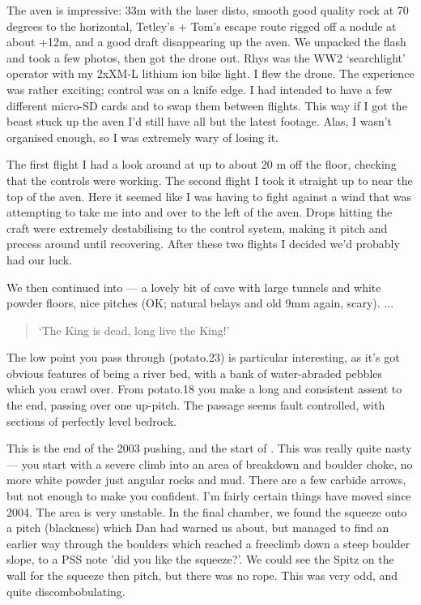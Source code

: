 The aven is impressive: 33m with the laser disto, smooth good quality rock at 70 degrees to the horizontal, Tetley's + Tom's escape route rigged off a nodule at about +12m, and a good draft disappearing up the aven.
We unpacked the flash and took a few photos, then got the drone out. Rhys was the WW2 `searchlight' operator with my 2xXM-L lithium ion bike light. I flew the drone.
The experience was rather exciting; control was on a knife edge. I had intended to have a few different micro-SD cards and to swap them between flights. This way if I got the beast stuck up the aven I'd still have all but the latest footage. Alas, I wasn't organised enough, so I was extremely wary of losing it.

The first flight I had a look around at up to about 20 m off the floor, checking that the controls were working. The second flight I took it straight up to near the top of the aven. Here it seemed like I was having to fight against a wind that was attempting to take me into and over to the left of the aven. Drops hitting the craft were extremely destabilising to the control system, making it pitch and precess around until recovering. After these two flights I decided we'd probably had our luck.

We then continued into  --- a lovely bit of cave with large tunnels and white powder floors, nice pitches (OK; natural belays and old 9mm again, scary). ...

\begin{quote}
`The King is dead, long live the King!'
\end{quote}

The low point you pass through (potato.23) is particular interesting, as it's got obvious features of being a river bed, with a bank of water-abraded pebbles which you crawl over.
From potato.18 you make a long and consistent assent to the end, passing over one up-pitch. The passage seems fault controlled, with sections of perfectly level bedrock.

This is the end of the 2003 pushing, and the start of . This was really quite nasty --- you start with a severe climb into an area of breakdown and boulder choke, no more white powder just angular rocks and mud. There are a few carbide arrows, but not enough to make you confident. I'm fairly certain things have moved since 2004. The area is very unstable. In the final chamber, we found the squeeze onto a pitch (blackness) which Dan had warned us about, but managed to find an earlier way through the boulders which reached a freeclimb down a steep boulder slope, to a PSS note 'did you like the squeeze?'. We could see the Spitz on the wall for the squeeze then pitch, but there was no rope. This was very odd, and quite discombobulating.

